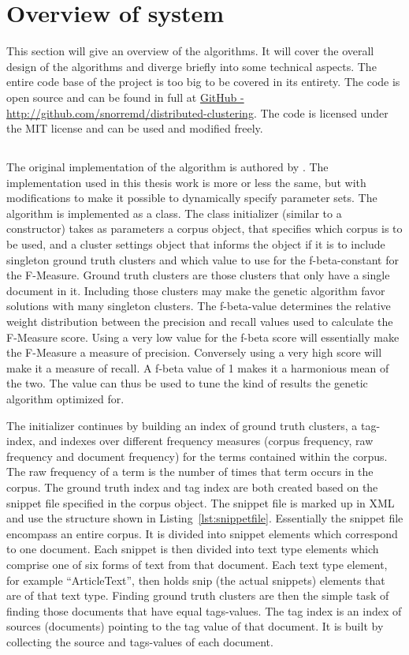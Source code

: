 \section{Overview of system}
This section will give an overview of the algorithms. It will cover the overall design of the algorithms and diverge briefly into some technical aspects. The entire code base of the project is too big to be covered in its entirety. The code is open source and can be found in full at \href{http://github.com/snorremd/distributed-clustering}{GitHub - http://github.com/snorremd/distributed-clustering}. The code is licensed under the MIT license and can be used and modified freely.

\subsection{\CTC}
The original implementation of the \CTC algorithm is authored by \cite{Moe2013}. The implementation used in this thesis work is more or less the same, but with modifications to make it possible to dynamically specify parameter sets. The \CTC algorithm is implemented as a class. The class initializer (similar to a constructor) takes as parameters a corpus object, that specifies which corpus is to be used, and a cluster settings object that informs the \CTC object if it is to include singleton ground truth clusters and which value to use for the f-beta-constant for the F-Measure. Ground truth clusters are those clusters that only have a single document in it. Including those clusters may make the genetic algorithm favor solutions with many singleton clusters. The f-beta-value determines the relative weight distribution between the precision and recall values used to calculate the F-Measure score. Using a very low value for the f-beta score will essentially make the F-Measure a measure of precision. Conversely using a very high score will make it a measure of recall. A f-beta value of 1 makes it a harmonious mean of the two. The value can thus be used to tune the kind of results the genetic algorithm optimized for.

The initializer continues by building an index of ground truth clusters, a tag-index, and indexes over different frequency measures (corpus frequency, raw frequency and document frequency) for the terms contained within the corpus. The raw frequency of a term is the number of times that term occurs in the corpus. The ground truth index and tag index are both created based on the snippet file specified in the corpus object. The snippet file is marked up in XML and use the structure shown in Listing~\ref{lst:snippetfile}. Essentially the snippet file encompass an entire corpus. It is divided into snippet elements which correspond to one document. Each snippet is then divided into text type elements which comprise one of six forms of text from that document. Each text type element, for example ``ArticleText'', then holds snip (the actual snippets) elements that are of that text type. Finding ground truth clusters are then the simple task of finding those documents that have equal tags-values. The tag index is an index of sources (documents) pointing to the tag value of that document. It is built by collecting the source and tags-values of each document.

